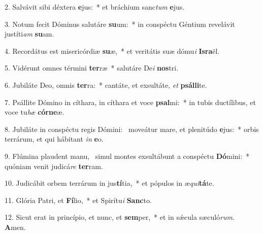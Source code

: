 2. Salvávit sibi déxtera \textbf{e}jus:~*  et bráchium sanc\textit{tum} \textbf{e}jus.\

3. Notum fecit Dóminus salutáre \textbf{su}um:~*  in conspéctu Géntium revelávit justíti\textit{am} \textbf{su}am.\

4. Recordátus est misericórdiæ \textbf{su}æ,~*  et veritátis suæ dómu\textit{i} \textbf{Is}\textbf{ra}ël.\

5. Vidérunt omnes términi \textbf{ter}ræ~*  salutáre De\textit{i} \textbf{nos}tri.\

6. Jubiláte Deo, omnis \textbf{ter}ra:~*  cantáte, et exsultáte, \textit{et} \textbf{psál}\textbf{li}te.\

7. Psállite Dómino in cíthara, in cíthara et voce \textbf{psal}mi:~*  in tubis ductílibus, et voce tu\textit{bæ} \textbf{cór}\textbf{ne}æ.\

8. Jubiláte in conspéctu regis Dómini: \dag\  moveátur mare, et plenitúdo \textbf{e}jus:~*  orbis terrárum, et qui hábitant \textit{in} \textbf{e}o.\

9. Flúmina plaudent manu, \dag\  simul montes exsultábunt a conspéctu \textbf{Dó}mini:~*  quóniam venit judicá\textit{re} \textbf{ter}ram.\

10. Judicábit orbem terrárum in jus\textbf{tí}tia,~*  et pópulos in æ\textit{qui}\textbf{tá}te.\

11. Glória Patri, et \textbf{Fí}lio,~*  et Spirítu\textit{i} \textbf{Sanc}to.\

12. Sicut erat in princípio, et nunc, et \textbf{sem}per,~*  et in sǽcula sæculó\textit{rum}. \textbf{A}men.\

